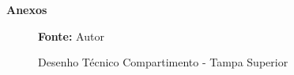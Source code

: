 \newpage
    \thispagestyle{empty}
    \centering
    \phantom{a}
    \vfill

    \Large
    \textbf{Anexos}
    
    \vfill
    \phantom{a}
\newpage

\begin{figure}[H]
    \centering
    \caption{Desenho Técnico Compartimento - Tampa Superior}
   
    \label{fig:enter-label}
    \textbf{Fonte: } Autor
\end{figure}


\newpage